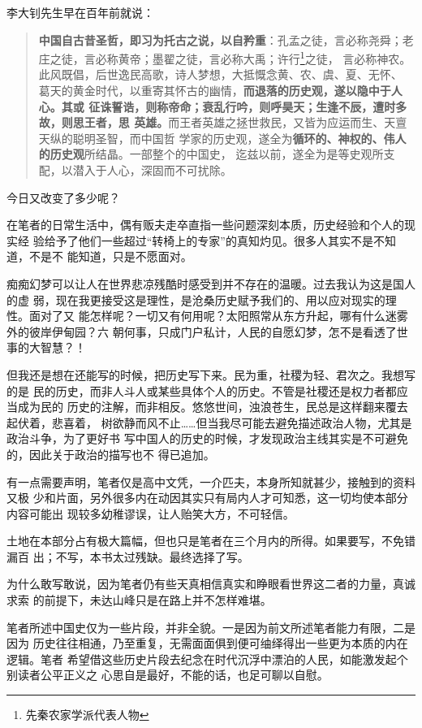 李大钊先生早在百年前就说：
\begin{quotation}
  \textbf{中国自古昔圣哲，即习为托古之说，以自矜重}：孔孟之徒，言必称尧舜；老
  庄之徒，言必称黄帝；墨翟之徒，言必称大禹；许行\footnote{先秦农家学派代表人物}之徒，
  言必称神农。此风既倡，后世逸民高歌，诗人梦想，大抵慨念黄、农、虞、夏、无怀、
  葛天的黄金时代，以重寄其怀古的幽情，\textbf{而退落的历史观，遂以隐中于人心。其或
    征诛誓诰，则称帝命；衰乱行吟，则呼昊天；生逢不辰，遭时多故，则思王者，思
    英雄。}而王者英雄之拯世救民，又皆为应运而生、天亶天纵的聪明圣智，而中国哲
  学家的历史观，遂全为\textbf{循环的、神权的、伟人的历史观}所结晶。一部整个的中国史，
  迄兹以前，遂全为是等史观所支配，以潜入于人心，深固而不可扰除。
\end{quotation}

今日又改变了多少呢？

在笔者的日常生活中，偶有贩夫走卒直指一些问题深刻本质，历史经验和个人的现实经
验给予了他们一些超过“转椅上的专家”的真知灼见。很多人其实不是不知道，不是不
能知道，只是不愿面对。

痴痴幻梦可以让人在世界悲凉残酷时感受到并不存在的温暖。过去我认为这是国人的虚
弱，现在我更接受这是理性，是沧桑历史赋予我们的、用以应对现实的理性。面对了又
能怎样呢？一切又有何用呢？太阳照常从东方升起，哪有什么迷雾外的彼岸伊甸园？六
朝何事，只成门户私计，人民的自愿幻梦，怎不是看透了世事的大智慧？！

但我还是想在还能写的时候，把历史写下来。民为重，社稷为轻、君次之。我想写的是
民的历史，而非人斗人或某些具体个人的历史。不管是社稷还是权力者都应当成为民的
历史的注解，而非相反。悠悠世间，浊浪苍生，民总是这样翻来覆去起伏着，悲喜着，
树欲静而风不止……但当我尽可能去避免描述政治人物，尤其是政治斗争，为了更好书
写中国人的历史的时候，才发现政治主线其实是不可避免的，因此关于政治的描写也不
得已追加。


有一点需要声明，笔者仅是高中文凭，一介匹夫，本身所知就甚少，接触到的资料又极
少和片面，另外很多内在动因其实只有局内人才可知悉，这一切均使本部分内容可能出
现较多幼稚谬误，让人贻笑大方，不可轻信。

土地在本部分占有极大篇幅，但也只是笔者在三个月内的所得。如果要写，不免错漏百
出；不写，本书太过残缺。最终选择了写。

为什么敢写敢说，因为笔者仍有些天真相信真实和睁眼看世界这二者的力量，真诚求索
的前提下，未达山峰只是在路上并不怎样难堪。

笔者所述中国史仅为一些片段，并非全貌。一是因为前文所述笔者能力有限，二是因为
历史往往相通，乃至重复，无需面面俱到便可䌷绎得出一些更为本质的内在逻辑。笔者
希望借这些历史片段去纪念在时代沉浮中漂泊的人民，如能激发起个别读者公平正义之
心思自是最好，不能的话，也足可聊以自慰。

